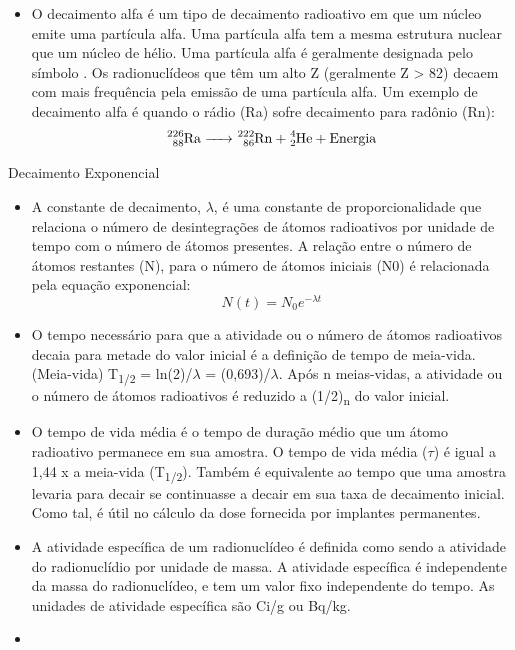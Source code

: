 \documentclass[11pt,a4paper]{article}
\newcounter{exemplo}
\begin{document}
\begin{exemplo}
\begin{itemize}
	   \item O decaimento alfa é um tipo de decaimento radioativo em que um núcleo emite uma partícula alfa. Uma partícula alfa tem a mesma estrutura nuclear que um núcleo de hélio. Uma partícula alfa é geralmente designada pelo símbolo . Os radionuclídeos que têm um alto Z (geralmente Z > 82) decaem com mais frequência pela emissão de uma partícula alfa. Um exemplo de decaimento alfa é quando o rádio (Ra) sofre decaimento para
	   radônio (Rn):
	   $$\ce{^{226}_{88}Ra -> ^{222}_{86}Rn + ^{4}_{2}He + Energia}$$
    \end{itemize}

	\textcolor{CarnationPink}{Decaimento Exponencial}

	\begin{itemize}
		\item A constante de decaimento, $\lambda$, é uma constante de proporcionalidade que relaciona o número de desintegrações de átomos radioativos por unidade de tempo com o número de átomos presentes. A relação entre o número de átomos restantes (N), para o número de átomos iniciais (N0) é relacionada pela equação exponencial:
		$$N(t) = N_0 e^{- \lambda t}$$

		\item O tempo necessário para que a atividade ou o número de átomos radioativos decaia para metade do valor inicial é a definição de tempo de meia-vida. (Meia-vida) T\textsubscript{1/2} = ln(2)/$\lambda$ = (0,693)/$\lambda$. Após n meias-vidas, a atividade ou o número de átomos radioativos é reduzido a (1/2)\textsubscript{n} do valor inicial.
		
		\item O tempo de vida média é o tempo de duração médio  que um átomo radioativo permanece em sua amostra. O tempo de vida média ($\tau$) é igual a 1,44 x a meia-vida (T\textsubscript{1/2}). Também é equivalente ao tempo que uma amostra levaria para decair se continuasse a decair em sua taxa de decaimento inicial. Como tal, é útil no cálculo da dose fornecida por implantes permanentes.
		
		\item A atividade específica de um radionuclídeo é definida como sendo a atividade do radionuclídio por unidade de massa. A atividade específica é independente da massa do radionuclídeo, e tem um valor fixo independente do tempo. As unidades de atividade específica são Ci/g ou Bq/kg.
		
		\item 
	\end{itemize}
\end{exemplo}
\end{document}
